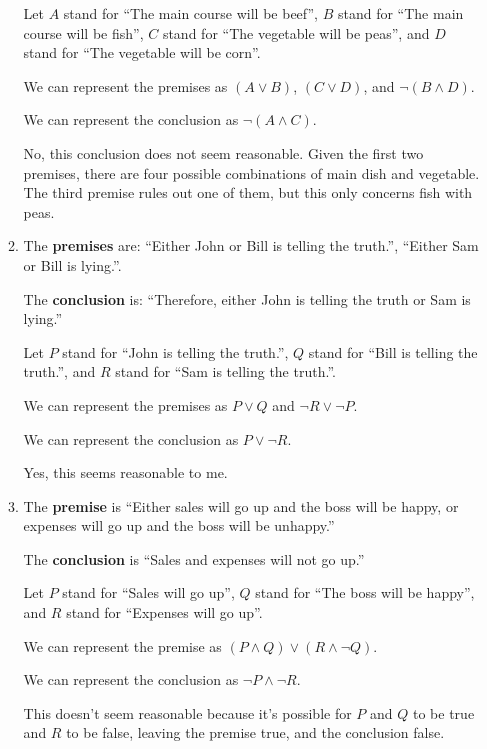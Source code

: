 \documentclass{article}
\begin{document}
\begin{enumerate}
\begin{enumerate}
    Let $A$ stand for ``The main course will be beef'', $B$ stand for ``The main course will be fish'', $C$ stand for ``The vegetable will be peas'', and $D$ stand for ``The vegetable will be corn''.

    We can represent the premises as $(A \lor B)$, $(C \lor D)$, and $\lnot (B \land D)$.

    We can represent the conclusion as $\lnot (A \land C)$.

    No, this conclusion does not seem reasonable.  Given the first two premises, there are four possible combinations of main dish and vegetable.  The third premise rules out one of them, but this only concerns fish with peas.

  \item The \textbf{premises} are: ``Either John or Bill is telling the truth.'', ``Either Sam or Bill is lying.''.

    The \textbf{conclusion} is: ``Therefore, either John is telling the truth or Sam is lying.''

    Let $P$ stand for ``John is telling the truth.'', $Q$ stand for ``Bill is telling the truth.'', and $R$ stand for ``Sam is telling the truth.''.

    We can represent the premises as $P \lor Q$ and $\lnot R \lor \lnot P$.

    We can represent the conclusion as $P \lor \lnot R$.

    Yes, this seems reasonable to me.

  \item
    The \textbf{premise} is ``Either sales will go up and the boss will be happy, or expenses will go up and the boss will be unhappy.''

    The \textbf{conclusion} is ``Sales and expenses will not go up.''

    Let $P$ stand for ``Sales will go up'', $Q$ stand for ``The boss will be happy'', and $R$ stand for ``Expenses will go up''.

    We can represent the premise as $(P \land Q) \lor (R \land \lnot Q)$.

    We can represent the conclusion as $\lnot P \land \lnot R$.

    This doesn't seem reasonable because it's possible for $P$ and $Q$ to be true and $R$ to be false, leaving the premise true, and the conclusion false.
    \end{enumerate}
\end{enumerate}
\end{document}
